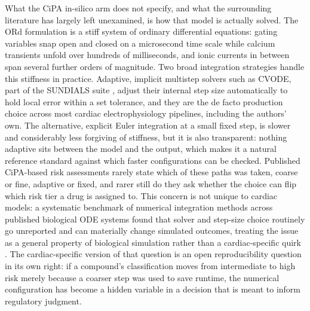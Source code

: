 \documentclass[journal]{IEEEtran}
\begin{document}
What the CiPA in-silico arm does not specify, and what the surrounding literature has largely left unexamined, is how that model is actually solved. The ORd formulation is a stiff system of ordinary differential equations: gating variables snap open and closed on a microsecond time scale while calcium transients unfold over hundreds of milliseconds, and ionic currents in between span several further orders of magnitude. Two broad integration strategies handle this stiffness in practice. Adaptive, implicit multistep solvers such as CVODE, part of the SUNDIALS suite \cite{hindmarsh2005}, adjust their internal step size automatically to hold local error within a set tolerance, and they are the de facto production choice across most cardiac electrophysiology pipelines, including the authors' own. The alternative, explicit Euler integration at a small fixed step, is slower and considerably less forgiving of stiffness, but it is also transparent: nothing adaptive sits between the model and the output, which makes it a natural reference standard against which faster configurations can be checked. Published CiPA-based risk assessments rarely state which of these paths was taken, coarse or fine, adaptive or fixed, and rarer still do they ask whether the choice can flip which risk tier a drug is assigned to. This concern is not unique to cardiac models: a systematic benchmark of numerical integration methods across published biological ODE systems found that solver and step-size choice routinely go unreported and can materially change simulated outcomes, treating the issue as a general property of biological simulation rather than a cardiac-specific quirk \cite{benchmarking2021}. The cardiac-specific version of that question is an open reproducibility question in its own right: if a compound's classification moves from intermediate to high risk merely because a coarser step was used to save runtime, the numerical configuration has become a hidden variable in a decision that is meant to inform regulatory judgment.
\end{document}
